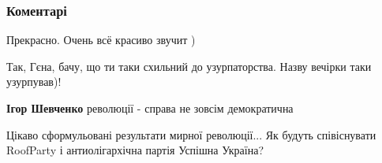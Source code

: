  
 
 
 
 
\subsubsection{Коментарі}

\begin{itemize}
 
Прекрасно. Очень всё красиво звучит )

 

Так, Гєна, бачу, що ти таки схильний до узурпаторства. Назву вечірки таки узурпував)!

\begin{itemize}
 
\textbf{Ігор Шевченко} революції - справа не зовсім демократична \Smiley[1.0][yellow]
\end{itemize}

 
Цікаво сформульовані результати мирної революції... Як будуть співіснувати RoofParty і антиолігархічна партія Успішна Україна?🤔

 


\end{itemize}
